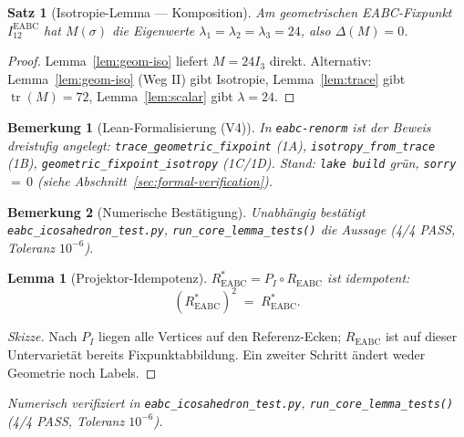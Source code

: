 \documentclass[11pt,a4paper]{article}
\newtheorem{theorem}{Satz}
\newtheorem{remark}{Bemerkung}
\newtheorem{lemma}{Lemma}
\begin{document}
	\begin{theorem}[Isotropie-Lemma — Komposition]
		\label{thm:isotropy}
		Am geometrischen EABC-Fixpunkt $I_{12}^{\mathrm{EABC}}$ hat $M(\sigma)$ die
		Eigenwerte $\lambda_1=\lambda_2=\lambda_3=24$, also $\Delta(M)=0$.
	\end{theorem}
	
	\begin{proof}
		Lemma~\ref{lem:geom-iso} liefert $M=24I_3$ direkt.
		Alternativ: Lemma~\ref{lem:geom-iso} (Weg II) gibt Isotropie,
		Lemma~\ref{lem:trace} gibt $\operatorname{tr}(M)=72$,
		Lemma~\ref{lem:scalar} gibt $\lambda=24$.
	\end{proof}
	
	\begin{remark}[Lean-Formalisierung (V4)]
		In \texttt{eabc-renorm} ist der Beweis dreistufig angelegt:
		\texttt{trace\_geometric\_fixpoint} (1A),
		\texttt{isotropy\_from\_trace} (1B),
		\texttt{geometric\_fixpoint\_isotropy} (1C/1D).
		Stand: \texttt{lake build} grün, \texttt{sorry}\,$=\,0$
		(siehe Abschnitt~\ref{sec:formal-verification}).
	\end{remark}
	
	\begin{remark}[Numerische Bestätigung]
		Unabhängig bestätigt \texttt{eabc\_icosahedron\_test.py},
		\texttt{run\_core\_lemma\_tests()} die Aussage (4/4 PASS, Toleranz $10^{-6}$).
	\end{remark}
	
	\begin{lemma}[Projektor-Idempotenz]
		\label{lem:idempotence}
		$R^*_{\mathrm{EABC}} = P_I \circ R_{\mathrm{EABC}}$ ist idempotent:
		\[
		(R^*_{\mathrm{EABC}})^2 \;=\; R^*_{\mathrm{EABC}}.
		\]
	\end{lemma}
	
	\begin{proof}[Skizze]
		Nach $P_I$ liegen alle Vertices auf den Referenz-Ecken; $R_{\mathrm{EABC}}$ ist
		auf dieser Untervarietät bereits Fixpunktabbildung. Ein zweiter Schritt ändert
		weder Geometrie noch Labels.
	\end{proof}
	
	\smallskip\noindent
	\textit{Numerisch verifiziert in \texttt{eabc\_icosahedron\_test.py},
		\texttt{run\_core\_lemma\_tests()} (4/4 PASS, Toleranz $10^{-6}$).}
	
\end{document}
